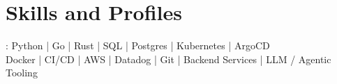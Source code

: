 \documentclass[]{jack-resume}
\begin{document}
\pagecolor{darkmodeBackground}

%
%



%
%
\begin{minipage}[t][1cm][t]{.03\textwidth}
    \hfill
\end{minipage}






\section{Skills and Profiles}
:
Python \hfill | \hfill
Go \hfill | \hfill
Rust \hfill | \hfill
SQL \hfill | \hfill
Postgres \hfill | \hfill
Kubernetes \hfill | \hfill
ArgoCD \\
\hspace{1.0cm} Docker \hfill | \hfill
CI/CD \hfill | \hfill
AWS \hfill | \hfill
Datadog \hfill | \hfill
Git \hfill | \hfill
Backend Services \hfill | \hfill
LLM / Agentic Tooling \\
\end{document}
